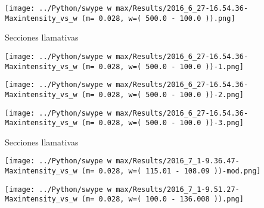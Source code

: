 				\begin{center}
					\texttt{[image: ../Python/swype w max/Results/2016\_6\_27-16.54.36-Maxintensity\_vs\_w (m= 0.028, w=( 500.0 - 100.0 )).png]}
				\end{center}
					
				Secciones llamativas
				
				\begin{minipage}{0.33\textwidth}
					\centering
					\texttt{[image: ../Python/swype w max/Results/2016\_6\_27-16.54.36-Maxintensity\_vs\_w (m= 0.028, w=( 500.0 - 100.0 ))-1.png]}
				\end{minipage}
				\begin{minipage}{0.33\textwidth}
					\centering
					\texttt{[image: ../Python/swype w max/Results/2016\_6\_27-16.54.36-Maxintensity\_vs\_w (m= 0.028, w=( 500.0 - 100.0 ))-2.png]}
				\end{minipage}
				\begin{minipage}{0.33\textwidth}
					\centering
					\texttt{[image: ../Python/swype w max/Results/2016\_6\_27-16.54.36-Maxintensity\_vs\_w (m= 0.028, w=( 500.0 - 100.0 ))-3.png]}
				\end{minipage}
				
					
				Secciones llamativas
								
				\begin{minipage}{0.5\textwidth}
					\centering
					\texttt{[image: ../Python/swype w max/Results/2016\_7\_1-9.36.47-Maxintensity\_vs\_w (m= 0.028, w=( 115.01 - 108.09 ))-mod.png]}

					\label{mapa w 028 ambos campos}
				\end{minipage}		
				\begin{minipage}{0.5\textwidth}
					\centering
					\texttt{[image: ../Python/swype w max/Results/2016\_7\_1-9.51.27-Maxintensity\_vs\_w (m= 0.028, w=( 100.0 - 136.008 )).png]}
				\end{minipage}	
					
